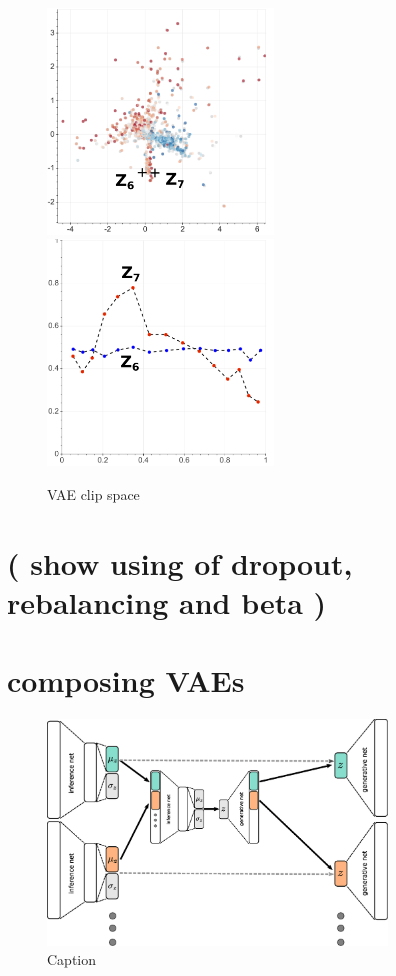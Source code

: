 \begin{figure}
    \includegraphics[height=6cm]{img/6_T_Hunch/ls_beta_clip_tcentro_67.png}
    \includegraphics[height=6cm]{img/6_T_Hunch/ls_beta_clip_tcentro_67_g.png}
    \caption{VAE clip space}
    \label{fig:my_label}
\end{figure}

\section{( show using of dropout, rebalancing and beta )}


\section{composing VAEs}

\begin{figure}
    \centering
    \includegraphics[height=6cm]{img/3_ML/VAE_COMPOSE.eps}
    \caption{Caption}
    \label{fig:my_label}
\end{figure}



